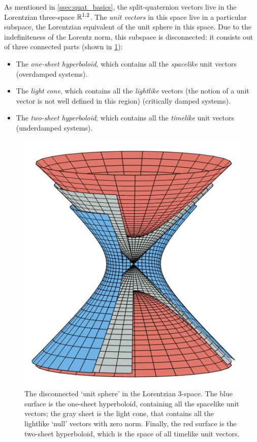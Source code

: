 As mentioned in \cref{ssec:quat_basics}, the split-quaternion vectors live in the Lorentzian three-space $\mathbb{R}^{1, 2}$. The \emph{unit vectors} in this space live in a particular subspace, the Lorentzian equivalent of the unit sphere in this space. Due to the indefiniteness of the Lorentz norm, this subspace is disconnected: it consists out of three connected parts (shown in \cref{fig:hyperboloids}):
\begin{itemize}
    \item The \emph{one-sheet hyperboloid}, which contains all the \emph{spacelike} unit vectors (overdamped systems).
    \item The \emph{light cone}, which contains all the \emph{lightlike} vectors (the notion of a unit vector is not well defined in this region) (critically damped systems).
    \item The \emph{two-sheet hyperboloid}; which contains all the \emph{timelike} unit vectors (underdamped systems).
\end{itemize}

\begin{figure}[ht!]
    \centering
    \includegraphics[]{media/other/lorentz_space.png}
    \caption{The disconnected `unit sphere' in the Lorentzian 3-space. The blue surface is the one-sheet hyperboloid, containing all the spacelike unit vectors; the gray sheet is the light cone, that contains all the lightlike `null' vectors with zero norm. Finally, the red surface is the two-sheet hyperboloid, which is the space of all timelike unit vectors.}
    \label{fig:hyperboloids}
\end{figure}

